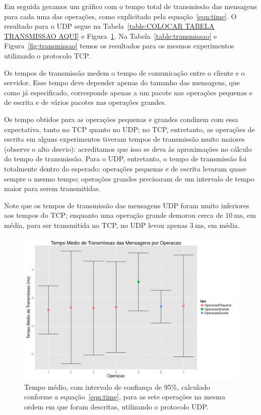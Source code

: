 \documentclass[12pt,a4paper]{article}
\begin{document}
Em seguida geramos um gráfico com o tempo total de transmissão das mensagens para cada uma das operações, como explicitado pela equação~\ref{eqn:time}. O resultado para o UDP segue na Tabela~\ref{table:COLOCAR TABELA TRANSMISSAO AQUI} e Figura~\ref{fig:transmissaoU}. Na Tabela~\ref{table:transmissao} e Figura~\ref{fig:transmissao} temos os resultados para os mesmos experimentos utilizando o protocolo TCP.

Os tempos de transmissão medem o tempo de comunicação entre o cliente e o servidor. Esse tempo deve depender apenas do tamanho das mensagens, que como já especificado, corresponde apenas a um pacote nas operações pequenas e de escrita e de vários pacotes nas operações grandes. 

Os tempo obtidos para as operações pequenas e grandes condizem com essa expectativa, tanto no TCP quanto no UDP; no TCP, entretanto, as operações de escrita em alguns experimentos tiveram tempos de transmissão muito maiores (observe o alto desvio): acreditamos que isso se deva às aproximações no cálculo do tempo de transmissão. Para o UDP, entretanto, o tempo de transmissão foi totalmente dentro do esperado: operações pequenas e de escrita levaram quase sempre o mesmo tempo; operações grandes precisaram de um intervalo de tempo maior para serem transmitidas.

Note que os tempos de transmissão das mensagens UDP foram muito inferiores aos tempos do TCP;  enquanto uma operação grande demorou cerca de $\SI{10}{\milli\second}$, em média, para ser transmitida no TCP, no UDP levou apenas $\SI{3}{\milli\second}$, em média.

\begin{figure}[h]
\centering
\includegraphics[width=\textwidth]{diagrama/resultadosTempoTransmissaoUDP.png}
\caption{Tempo médio, com intervalo de confiança de 95\%, calculado conforme a equação~\ref{eqn:time}, para as sete operações na mesma ordem em que foram descritas, utilizando o protocolo UDP.}
\label{fig:transmissaoU}
\end{figure}
\end{document}
